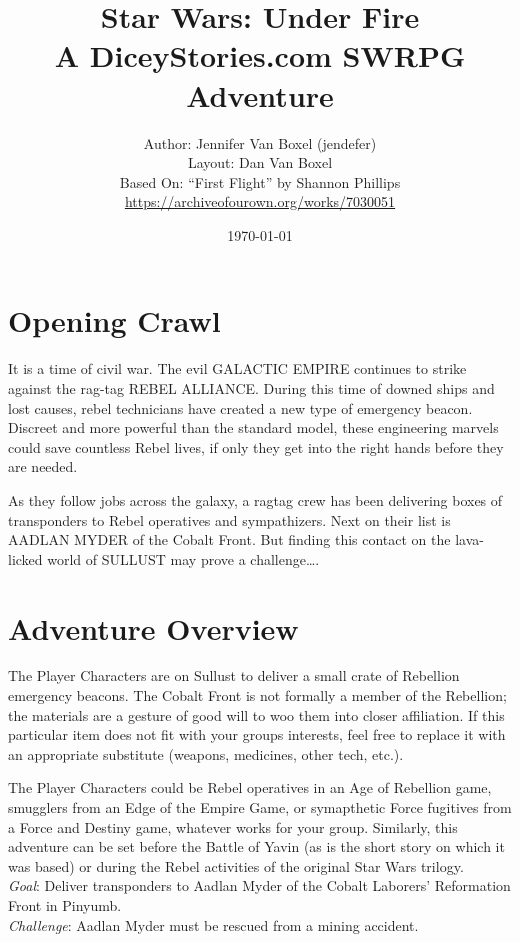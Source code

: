 \documentclass{book}
\title{
Star Wars: Under Fire \\
A DiceyStories.com SWRPG Adventure\\
}
\author{Author: Jennifer Van Boxel (jendefer)\\
        Layout: Dan Van Boxel\\
        Based On: ``First Flight'' by Shannon Phillips \\\url{https://archiveofourown.org/works/7030051}}
\date{\today}
\begin{document}
\maketitle


\begin{multicols}{2}
\section{Opening Crawl}


It is a time of civil war. The evil GALACTIC EMPIRE continues to strike against the rag-tag REBEL ALLIANCE. During this time of downed ships and lost causes, rebel technicians have created a new type of emergency beacon. Discreet and more powerful than the standard model, these engineering marvels could save countless Rebel lives, if only they get into the right hands before they are needed.

As they follow jobs across the galaxy, a ragtag crew has been delivering boxes of transponders to Rebel operatives and sympathizers. Next on their list is AADLAN MYDER of the Cobalt Front. But finding this contact on the lava-licked world of SULLUST may prove a challenge….



\section{Adventure Overview }

The Player Characters are on Sullust to deliver a small crate of Rebellion emergency beacons. The Cobalt Front is not formally a member of the Rebellion; the materials are a gesture of good will to woo them into closer affiliation. If this particular item does not fit with your groups interests, feel free to replace it with an appropriate substitute (weapons, medicines, other tech, etc.).

The Player Characters could be Rebel operatives in an Age of Rebellion game, smugglers from an Edge of the Empire Game, or symapthetic Force fugitives from a Force and Destiny game, whatever works for your group. Similarly, this adventure can be set before the Battle of Yavin (as is the short story on which it was based) or during the Rebel activities of the original Star Wars trilogy.\\
\emph{Goal}: Deliver transponders to Aadlan Myder of the Cobalt Laborers’ Reformation Front in Pinyumb.\\
\emph{Challenge}: Aadlan Myder must be rescued from a mining accident.


\end{multicols}
\end{document}
